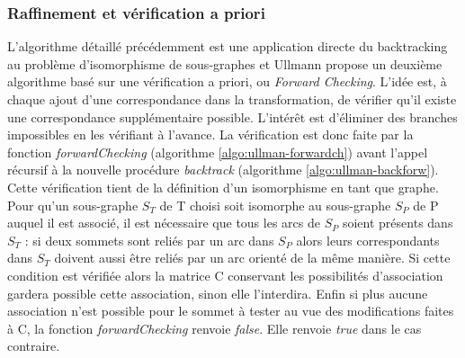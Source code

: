 \subsubsection{Raffinement et vérification a priori}
L'algorithme détaillé précédemment est une application directe du backtracking au problème d'isomorphisme de sous-graphes et Ullmann propose un deuxième algorithme basé sur une vérification a priori, ou \emph{Forward Checking}. L'idée est, à chaque ajout d'une correspondance dans la transformation,
de vérifier qu'il existe une correspondance supplémentaire possible. L'intérêt est d'éliminer des branches impossibles en les vérifiant à l'avance. La vérification est donc faite par la fonction \emph{forwardChecking} (algorithme \ref{algo:ullman-forwardch}) avant l'appel récursif à la nouvelle procédure \emph{backtrack} (algorithme \ref{algo:ullman-backforw}). 
Cette vérification tient de la définition d'un isomorphisme en tant que graphe.
Pour qu'un sous-graphe $S_T$ de T choisi soit isomorphe au sous-graphe $S_P$ de P auquel il est associé, il est nécessaire que tous les arcs de $S_P$ soient présents dans $S_T$ : si deux sommets sont reliés par un arc dans $S_P$ alors leurs correspondants
dans $S_T$ doivent aussi être reliés par un arc orienté de la même manière. Si cette condition est vérifiée alors la matrice C conservant les possibilités d'association gardera
possible cette association, sinon elle l'interdira. Enfin si plus aucune association n'est possible pour le sommet à tester au vue des modifications faites à C, la fonction
\emph{forwardChecking} renvoie \emph{false}. Elle renvoie \emph{true} dans le cas contraire. 


